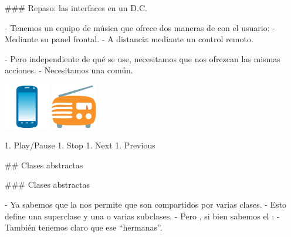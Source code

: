 

\columnsend

### Repaso: las interfaces en un D.C.


- Tenemos un equipo de música que ofrece dos maneras de  con
el usuario:
    - Mediante su panel frontal.
    - A distancia mediante un control remoto.

- Pero independiente de qué se use, necesitamos que nos ofrezcan las mismas acciones.
    - Necesitamos una  común.

\columnsbegin
{}
\centering\includegraphics[width=20mm]{icons/554-emoji_android_mobile_phone.png}
\centering\includegraphics[width=20mm]{icons/562-emoji_android_radio.png}

\vspace{-5em}
1. Play/Pause
1. Stop
1. Next
1. Previous

\columnsend

## Clases abstractas

### Clases abstractas


- Ya sabemos que la  nos permite  que son
compartidos por varias clases.
    - Esto define una superclase y una o varias subclases.
- Pero , si bien sabemos el :
    - También tenemos claro que ese  ``hermanas''.

